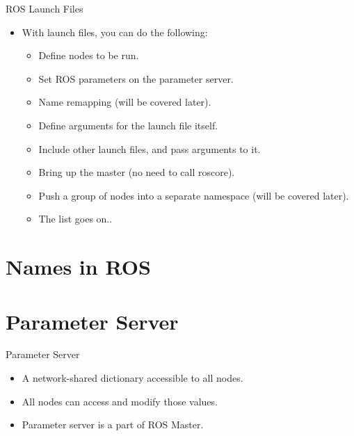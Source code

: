 \documentclass{beamer}
\begin{document}
\begin{frame}{ROS Launch Files}
    \begin{itemize}        
        \item With launch files, you can do the following:
        \begin{itemize}
            \item Define nodes to be run.
            
            \item Set ROS parameters on the parameter server.
            
            \item Name remapping (will be covered later).
            
            \item Define arguments for the launch file itself.
            
            \item Include other launch files, and pass arguments to it.
            
            \item Bring up the master (no need to call {\ttfamily \colorbox{gray!30!white}{roscore}}).
            
            \item Push a group of nodes into a separate namespace (will be covered later).
           
             \item The list goes on..          
           \end{itemize} 

        
    \end{itemize}  
\end{frame}



\section{Names in ROS}

\section{Parameter Server}

\begin{frame}{Parameter Server}
    \begin{itemize}
        \item A network-shared dictionary accessible to all nodes.
        \item  All nodes can access and modify those values.
        \item Parameter server is a part of ROS Master.
    \end{itemize}  
\end{frame}
\end{document}
